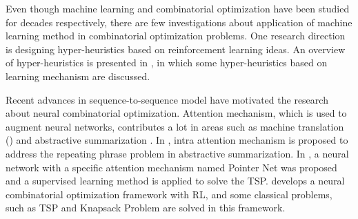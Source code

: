 Even though machine learning and combinatorial optimization have been studied for decades respectively, there are few investigations about application of machine learning method in combinatorial optimization problems. One research direction is designing hyper-heuristics based on reinforcement learning ideas. An overview of hyper-heuristics is presented in \cite{burke2013hyper}, in which some hyper-heuristics based on learning mechanism are discussed. %


Recent advances in sequence-to-sequence model \cite{sutskever2014sequence} have motivated the research about neural combinatorial optimization. Attention mechanism, which is used to augment neural networks, contributes a lot in areas such as machine translation (\cite{bahdanau2014neural}) and abstractive summarization \cite{paulus2017deep}. In \cite{paulus2017deep}, intra attention mechanism is proposed to address the repeating phrase problem in abstractive summarization. In \cite{vinyals2015pointer}, a neural network with a specific attention mechanism named Pointer Net was proposed and a supervised learning method is applied to solve the TSP. \cite{bello2016neural} develops a neural combinatorial optimization framework with RL, and some classical problems, such as TSP and Knapsack Problem are solved in this framework. %


